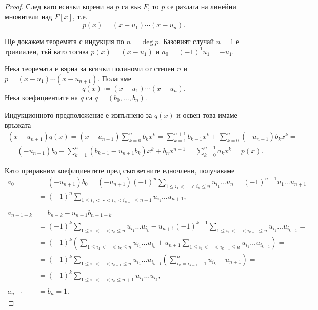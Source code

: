 \documentclass[numbers=endperiod, DIV=15, bibliography=totocnumbered]{scrartcl}
\begin{document}
\begin{proof}
  След като всички корени на $p$ са във $F$, то $p$ се разлага на линейни множители над $F[x]$, т.е.
  \begin{displaymath}
    p(x) = (x - u_1) \cdots (x - u_n).
  \end{displaymath}

  Ще докажем теоремата с индукция по $n = \deg p$. Базовият случай $n = 1$ е тривиален, тъй като тогава $p(x) = (x - u_1)$ и $a_0 = {(-1)}^1 u_1 = -u_1$.

  Нека теоремата е вярна за всички полиноми от степен $n$ и $p = (x - u_1) \cdots (x - u_{n+1})$. Полагаме
  \begin{displaymath}
    q(x) \coloneqq (x - u_1) \cdots (x - u_n).
  \end{displaymath}
  Нека коефициентите на $q$ са $q = (b_0, \ldots, b_n)$.

  Индукционното предположение е изпълнено за $q(x)$ и освен това имаме връзката
  \begin{multline*}
    (x - u_{n+1}) q(x)
    =
    (x - u_{n+1}) \sum_{k=0}^n b_k x^k
    =
    \sum_{k=1}^{n+1} b_{k-1} x^k + \sum_{k=0}^n (-u_{n+1}) b_k x^k
    = \\ =
    (-u_{n+1}) b_0 + \sum_{k=1}^n (b_{k-1} - u_{n+1} b_k) x^k + b_n x^{n+1}
    =
    \sum_{k=0}^{n+1} a_k x^k
    =
    p(x).
  \end{multline*}

  Като приравним коефициентите пред съответните едночлени, получаваме
  \begin{align*}
    a_0
    &=
    (-u_{n+1}) b_0
    =
    (-u_{n+1}) {(-1)}^n \sum_{1 \leq i_1 < \cdots < i_n \leq n} u_{i_1} \ldots u_n
    =
    {(-1)}^{n+1} u_1 \ldots u_{n+1}
    = \\ &=
    {(-1)}^n \sum_{1 \leq i_1 < \cdots < i_n < i_{n+1} \leq n + 1} u_{i_1} \ldots u_{n+1},
    \\ \\
    a_{n+1-k}
    &=
    b_{n-k} - u_{n+1} b_{n+1-k}
    = \\ &=
    {(-1)}^k \sum_{1 \leq i_1 < \cdots < i_k \leq n} u_{i_1} \ldots u_{i_k} - u_{n+1} {(-1)}^{k-1} \sum_{1 \leq i_1 < \cdots < i_{k-1} \leq n} u_{i_1} \ldots u_{i_{k-1}}
    = \\ &=
    {(-1)}^k \left( \sum_{1 \leq i_1 < \cdots < i_k \leq n} u_{i_1} \ldots u_{i_k} + u_{n+1} \sum_{1 \leq i_1 < \cdots < i_{k-1} \leq n} u_{i_1} \ldots u_{i_{k-1}} \right)
    = \\ &=
    {(-1)}^k \sum_{1 \leq i_1 < \cdots < i_{k-1} \leq n} u_{i_1} \ldots u_{i_{k-1}} \left(\sum_{i_k=i_{k-1}+1}^n u_{i_k} + u_{n+1} \right)
    = \\ &=
    {(-1)}^k \sum_{1 \leq i_1 < \cdots < i_k \leq n + 1} u_{i_1} \ldots u_{i_k},
    \\ \\
    a_{n+1} &= b_n = 1.
  \end{align*}
\end{proof}
\end{document}
